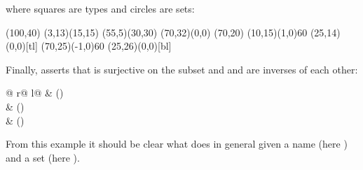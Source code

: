 \begin{isabellebody}
\begin{isamarkuptext}
where squares are types and circles are sets:
\begin{center}
\thicklines
\begin{picture}(100,40)
\put(3,13){\framebox(15,15){}}
\put(55,5){\framebox(30,30){}}
\put(70,32){\makebox(0,0){}}
\put(70,20){}
\put(10,15){\vector(1,0){60}}
\put(25,14){\makebox(0,0)[tl]{}}
\put(70,25){\vector(-1,0){60}}
\put(25,26){\makebox(0,0)[bl]{}}
\end{picture}
\end{center}
Finally,  asserts that  is
surjective on the subset  and  and  are inverses of each other:
\begin{center}
\begin{tabular}{@ {}r@ {\qquad\qquad}l@ {}}
 & () \\
 & () \\
 & ()
\end{tabular}
\end{center}
%
From this example it should be clear what  does
in general given a name (here ) and a set
(here ).


\end{isamarkuptext}
\end{isabellebody}
